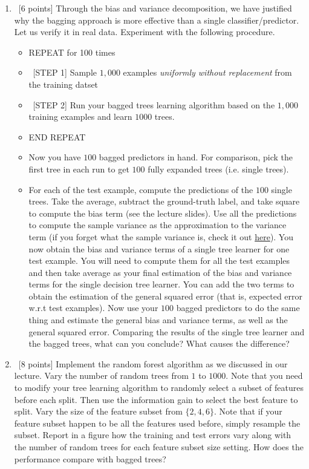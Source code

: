 \documentclass[12pt, fullpage,letterpaper]{article}
\begin{document}
\begin{enumerate}
\begin{enumerate}
	\item~[6 points] Through the bias and variance decomposition, we have justified why the bagging approach is more effective than a single classifier/predictor. Let us verify it in real data. Experiment with the following procedure.
	\begin{itemize}
		\item REPEAT for 100 times
		\item ~[STEP 1] Sample $1,000$ examples \textit{uniformly without replacement} from the training datset
		\item ~[STEP 2] Run your bagged trees learning algorithm based on the $1,000$ training examples and learn $1000$ trees.
		\item END REPEAT 
		\item Now you have $100$ bagged predictors in hand. For comparison, pick the first tree in each run to get $100$ fully expanded trees (i.e. single trees). 
		\item 	For each of the test example, compute the predictions of the $100$ single trees. Take the average, subtract the ground-truth label, and take square to compute the bias term (see the lecture slides). Use all the predictions to compute the sample variance  as the approximation to the variance term (if you forget what the sample variance is, check it out 
		\href{http://www.randomservices.org/random/sample/Variance.html}{here}). You now obtain the bias and variance terms of a single tree learner for one test example. You will need to compute them for all the test examples and then take average as your final estimation of the bias and variance terms for the single decision tree learner. You can add the two terms to obtain the estimation of the general squared error (that is, expected error w.r.t test examples). Now use your $100$ bagged predictors to do the same thing and estimate the general bias and variance terms, as well as the general squared error.  Comparing the results of the single tree learner and the bagged trees, what can you conclude?  What causes the difference?  
	\end{itemize}
	 
	\item~[8 points] Implement the random forest algorithm as we discussed in our lecture. Vary the number of random trees from $1$ to $1000$. Note that you need to modify your tree learning algorithm to randomly select a subset of features before each split. Then use the information gain to select the best feature to split.  Vary the size of the feature subset from $\{2, 4, 6\}$. Note that if your feature subset happen to be all the features used before, simply resample the subset.  Report in a figure how the training and test errors vary along with the number of random trees for each feature subset size setting. How does the performance compare with bagged trees? 
	

\end{enumerate}
\end{enumerate}
\end{document}
